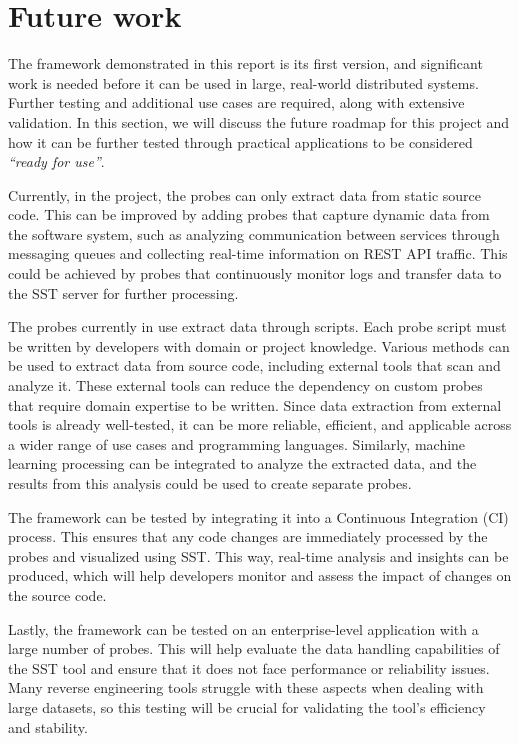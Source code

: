 \section{Future work}

The framework demonstrated in this report is its first version, and significant work is needed before it can be used in large, real-world distributed systems. Further testing and additional use cases are required, along with extensive validation. In this section, we will discuss the future roadmap for this project and how it can be further tested through practical applications to be considered \textit{``ready for use''}.

Currently, in the project, the probes can only extract data from static source code. This can be improved by adding probes that capture dynamic data from the software system, such as analyzing communication between services through messaging queues and collecting real-time information on REST API traffic. This could be achieved by probes that continuously monitor logs and transfer data to the SST server for further processing.

The probes currently in use extract data through scripts. Each probe script must be written by developers with domain or project knowledge. Various methods can be used to extract data from source code, including external tools that scan and analyze it. These external tools can reduce the dependency on custom probes that require domain expertise to be written. Since data extraction from external tools is already well-tested, it can be more reliable, efficient, and applicable across a wider range of use cases and programming languages. Similarly, machine learning processing can be integrated to analyze the extracted data, and the results from this analysis could be used to create separate probes.

The framework can be tested by integrating it into a Continuous Integration (CI) process. This ensures that any code changes are immediately processed by the probes and visualized using SST. This way, real-time analysis and insights can be produced, which will help developers monitor and assess the impact of changes on the source code.

Lastly, the framework can be tested on an enterprise-level application with a large number of probes. This will help evaluate the data handling capabilities of the SST tool and ensure that it does not face performance or reliability issues. Many reverse engineering tools struggle with these aspects when dealing with large datasets, so this testing will be crucial for validating the tool’s efficiency and stability.
